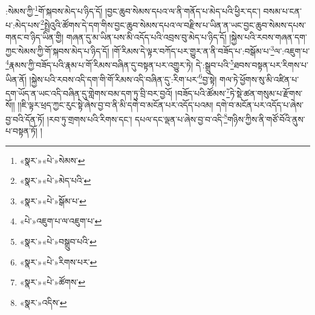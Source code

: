 :སེམས་ཀྱི་\footnote{«སྣར་»«པེ་»སེམས་}གོ་སྐབས་མེད་པ་ཉིད་དོ། །བྱང་ཆུབ་སེམས་དཔའ་ལ་ནི་གནོད་པ་མེད་པའི་ཕྱིར་དང་། བསམ་པ་ངན་པ་:མེད་པས་\footnote{«སྣར་»«པེ་»མེད་པའི་}སྤྲེའུའི་ཚོགས་དེ་དག་གིས་བྱང་ཆུབ་སེམས་དཔའ་ལ་བརྫིས་པ་ཡིན་ན་ཡང་བྱང་ཆུབ་སེམས་དཔས་གནང་བ་ཉིད་ཡིན་གྱི། གཞན་དུ་མ་ཡིན་པས་མི་འདོད་པའི་འབྲས་བུ་མེད་པ་ཉིད་དོ། །སྐྱེས་པའི་རབས་གཞན་དག་ཀྱང་སེམས་ཀྱི་གོ་སྐབས་མེད་པ་ཉིད་དོ། །གོ་རིམས་དེ་ལྟར་བཀོད་པར་གྱུར་ན་ནི་བཟོད་པ་:བསྒོམ་པ་\footnote{«སྣར་»«པེ་»སྒོམ་པ་}ལ་:འཇུག་པ་\footnote{«པེ་»འཇུག་པ་ལ་འཇུག་པ་}རྣམས་ཀྱི་བཟོད་པའི་རྣམ་པ་གོ་རིམས་བཞིན་དུ་བསྟན་པར་འགྱུར་ཏེ། དེ་:སྒྲུབ་པའི་\footnote{«སྣར་»«པེ་»བསྒྲུབ་པའི་}ཐབས་བསྟན་པར་རིགས་པ་ཡིན་ནོ། །སྐྱེས་པའི་རབས་འདི་དག་གི་གོ་རིམས་འདི་བཞིན་དུ་:རིག་པར་\footnote{«སྣར་»«པེ་»རིགས་པར་}བྱ་སྟེ། གལ་ཏེ་ཕྱོགས་སུ་མི་འཛིན་པ་དག་ཡོད་ན་ཡང་འདི་བཞིན་དུ་གླེགས་བམ་དག་ཏུ་བྲི་བར་བྱའོ། །བཟོད་པའི་ཚོམས་\footnote{«སྣར་»«པེ་»ཚོགས་}ཏེ་སྡེ་ཚན་གསུམ་པ་རྫོགས་སོ།། །།ཇི་ལྟར་ཕྲད་ཀྱང་རུང་སྟེ་ཞེས་བྱ་བ་ནི་མི་དགེ་བ་མངོན་པར་འདོད་པའམ། དགེ་བ་མངོན་པར་འདོད་པ་ཞེས་བྱ་བའི་དོན་ཏོ། །རབ་ཏུ་གྲགས་པའི་རིགས་དང་། དཔལ་དང་ལྡན་པ་ཞེས་བྱ་བ་འདི་\footnote{«སྣར་»འདིས་}གཉིས་ཀྱིས་ནི་གཙོ་བོའི་ནུས་པ་བསྟན་ཏོ། །
